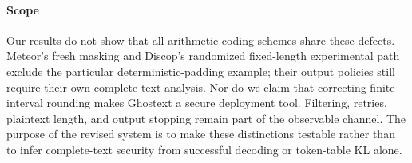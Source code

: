 \paragraph{Scope}
Our results do not show that all arithmetic-coding schemes share these defects.
Meteor's fresh masking and Discop's randomized fixed-length experimental path
exclude the particular deterministic-padding example; their output policies
still require their own complete-text analysis. Nor do we claim that correcting finite-interval
rounding makes Ghostext a secure deployment tool. Filtering, retries, plaintext
length, and output stopping remain part of the observable channel. The purpose
of the revised system is to make these distinctions testable rather than to
infer complete-text security from successful decoding or token-table KL alone.
